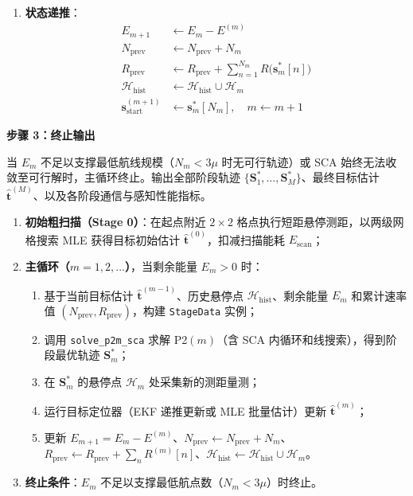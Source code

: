 \begin{enumerate}
\begin{itemize}
            \item 若使用 EKF（在线递推模式），以上一阶段后验 $\hat{\mathbf{t}}^{(m-1)}$ 作为先验，依次注入 $K_m$ 个新量测执行更新；
        \end{itemize}
    \item[2-6)] \textbf{状态递推}：
        \begin{align}
            E_{m+1}&\leftarrow E_m-E^{(m)} \label{eq:update_E}\\
            N_{\mathrm{prev}}&\leftarrow N_{\mathrm{prev}}+N_m \label{eq:update_N}\\
            R_{\mathrm{prev}}&\leftarrow R_{\mathrm{prev}}+\sum_{n=1}^{N_m}R\bigl(\mathbf{s}_m^*[n]\bigr) \label{eq:update_R}\\
            \mathcal{H}_{\mathrm{hist}}&\leftarrow\mathcal{H}_{\mathrm{hist}}\cup\mathcal{H}_m \label{eq:update_H}\\
            \mathbf{s}_{\mathrm{start}}^{(m+1)}&\leftarrow\mathbf{s}_m^*[N_m],\quad m\leftarrow m+1 \label{eq:update_start}
        \end{align}
\end{enumerate}

\noindent\textbf{步骤 3：终止输出}

当 $E_m$ 不足以支撑最低航线规模（$N_m<3\mu$ 时无可行轨迹）或 SCA 始终无法收敛至可行解时，主循环终止。输出全部阶段轨迹 $\{\mathbf{S}_1^*,\ldots,\mathbf{S}_{M}^*\}$、最终目标估计 $\hat{\mathbf{t}}^{(M)}$、以及各阶段通信与感知性能指标。

\begin{enumerate}
    \item \textbf{初始粗扫描（Stage 0）}：在起点附近 $2\times 2$ 格点执行短距悬停测距，以两级网格搜索 MLE 获得目标初始估计 $\hat{\mathbf{t}}^{(0)}$，扣减扫描能耗 $E_{\mathrm{scan}}$；
    \item \textbf{主循环（$m=1,2,\ldots$）}，当剩余能量 $E_m>0$ 时：
    \begin{enumerate}
        \item 基于当前目标估计 $\hat{\mathbf{t}}^{(m-1)}$、历史悬停点 $\mathcal{H}_{\mathrm{hist}}$、剩余能量 $E_m$ 和累计速率值 $(N_{\mathrm{prev}},R_{\mathrm{prev}})$，构建 \texttt{StageData} 实例；
        \item 调用 \texttt{solve\_p2m\_sca} 求解 P2$(m)$（含 SCA 内循环和线搜索），得到阶段最优轨迹 $\mathbf{S}_m^*$；
        \item 在 $\mathbf{S}_m^*$ 的悬停点 $\mathcal{H}_m$ 处采集新的测距量测；
        \item 运行目标定位器（EKF 递推更新或 MLE 批量估计）更新 $\hat{\mathbf{t}}^{(m)}$；
        \item 更新 $E_{m+1}=E_m-E^{(m)}$、$N_{\mathrm{prev}}\leftarrow N_{\mathrm{prev}}+N_m$、$R_{\mathrm{prev}}\leftarrow R_{\mathrm{prev}}+\sum_n R^{(m)}[n]$、$\mathcal{H}_{\mathrm{hist}}\leftarrow\mathcal{H}_{\mathrm{hist}}\cup\mathcal{H}_m$。
    \end{enumerate}
    \item \textbf{终止条件}：$E_m$ 不足以支撑最低航点数（$N_m<3\mu$）时终止。
\end{enumerate}

